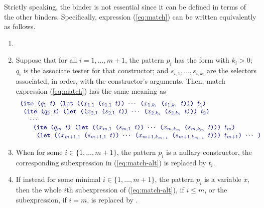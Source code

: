 Strictly speaking, the  binder is not essential 
since it can be defined in terms of the other binders. 
Specifically, expression (\ref{eq:match})
can be written equivalently as follows.
\begin{enumerate}
  \item {}
\item
Suppose that for all $i=1,\ldots, m + 1$, the pattern $p_i$ has the form
 with $k_i>0$;
$q_i$ is the associate tester for that constructor; and
$s_{i,1}, \ldots, s_{i,k_i}$ are the selectors associated, in order,
with the constructor's arguments.
Then, match expression (\ref{eq:match}) has the same meaning as 
%
\begin{equation} \label{eq:match-alt}
\begin{array}{l}
\expr{(ite ($q_1$ $t$) 
 (let (($x_{1,1}$ ($s_{1,1}$ $t$)) $\cdots$ ($x_{1,k_1}$ ($s_{1,k_1}$ $t$))) $t_1$)}
\\
\expr{ (ite ($q_2$ $t$) 
 (let (($x_{2,1}$ ($s_{2,1}$ $t$)) $\cdots$ ($x_{2,k_2}$ ($s_{2,k_2}$ $t$))) $t_2$)}
\\
\quad \expr{ $\cdots$}
\\
\quad\quad\expr{(ite ($q_m$ $t$) 
 (let (($x_{m,1}$ ($s_{m,1}$ $t$)) $\cdots$ ($x_{m,k_m}$ ($s_{m,k_m}$ $t$))) $t_m$)}
\\
\quad\quad\expr{ (let (($x_{m+1,1}$ ($s_{m+1,1}$ $t$)) $\cdots$ ($x_{m+1,k_{m+1}}$ ($s_{m+1,k_{m+1}}$ $t$))) $t_{m+1}$) $\cdots$ ) }
\end{array}
\end{equation}

\item 
When for some $i \in \{1,\ldots, m + 1\}$, the pattern $p_i$ is a nullary constructor, 
the corresponding  subexpression in (\ref{eq:match-alt}) is replaced 
by $t_i$.

\item 
If instead for some minimal $i \in \{1,\ldots, m + 1\}$, the pattern $p_i$ is
a variable $x$, then the whole $i$th  subexpression of (\ref{eq:match-alt}),
if $i\leq m$, 
or the  subexpression, if $i=m$, is replaced by .
\end{enumerate}


